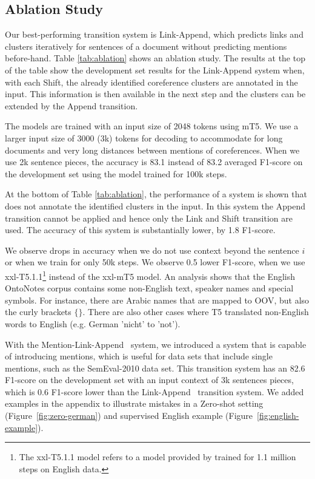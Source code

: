 \documentclass[11pt,a4paper]{article}
\newcommand{\LA}{Link-Append}
\newcommand{\M}{Mention-Link-Append}
\begin{document}
\subsection{Ablation Study}

Our best-performing transition system is Link-Append, which predicts links and clusters iteratively for sentences of a document without predicting mentions before-hand. Table \ref{tab:ablation} shows an ablation study. The results at the top of the table show the development set results for the Link-Append system when, with each {\sc Shift}, the already identified coreference clusters are annotated in the input. This information is then available in the next step and the clusters can be extended by the {\sc Append} transition.


The models are trained with an input size of 2048 tokens using mT5. We use a larger input size of 3000 (3k) tokens for decoding to accommodate for long documents and very long distances between mentions of coreferences. When we use 2k sentence pieces, the accuracy is 83.1 instead of 83.2 averaged F1-score on the development set using the model trained for 100k steps. 

At the bottom of Table \ref{tab:ablation}, the performance of a system is shown that does not annotate the identified clusters in the input. In this system the Append transition cannot be applied and hence only the Link and Shift transition are used. The accuracy of this system is substantially lower, by 1.8 F1-score. 

We observe drops in accuracy when we do not use context beyond the sentence $i$ or when we train for only 50k steps. We observe 0.5 lower F1-score, when we use xxl-T5.1.1\footnote{The xxl-T5.1.1 model refers to a model provided by  trained for 1.1 million steps on English data.} instead of the xxl-mT5 model. An analysis shows that the English OntoNotes corpus contains some non-English text, speaker names and special symbols. For instance, there are Arabic names that are mapped to OOV, but also the curly brackets $\{ \}$. There are also other cases where T5 translated non-English words to English (e.g. German 'nicht' to 'not'). 
 
With the \M~ system, we introduced a system that is capable of introducing mentions, which is useful for data sets that include single mentions, such as the SemEval-2010 data set. This transition system has an 82.6 F1-score on the development set with an input context of 3k sentences pieces, which is 0.6 F1-score lower than the \LA~ transition system. 
We added  examples in the appendix to illustrate mistakes in a Zero-shot setting (Figure~\ref{fig:zero-german}) and supervised English example (Figure~\ref{fig:english-example}). 
\end{document}

